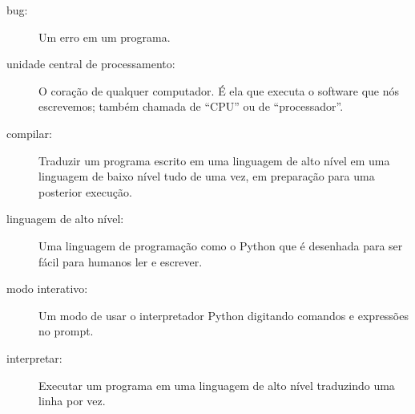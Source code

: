 \begin{description}
%

\item[bug:]  Um erro em um programa.
%

\item[unidade central de processamento:] O coração de qualquer computador.  É ela
que executa o software que nós escrevemos; também chamada de ``CPU'' ou de ``processador''.
%

\item[compilar:]  Traduzir um programa escrito em uma linguagem de alto nível
em uma linguagem de baixo nível tudo de uma vez, em preparação para uma posterior
execução.
%

\item[linguagem de alto nível:]  Uma linguagem de programação como o Python
que é desenhada para ser fácil para humanos ler e escrever.
%

\item[modo interativo:] Um modo de usar o interpretador Python
digitando comandos e expressões no prompt.
%

\item[interpretar:]  Executar um programa em uma linguagem de alto nível
traduzindo uma linha por vez.
%


\end{description}
